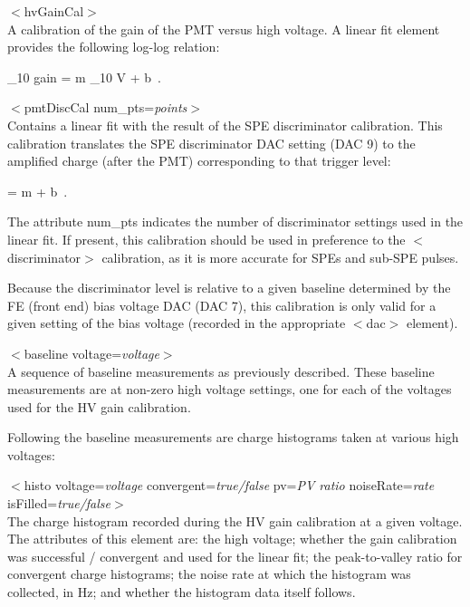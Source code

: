 \documentclass[10pt]{article}
\begin{document}
\item{$<$hvGainCal$>$}\\ 
A calibration of the gain of the PMT versus high voltage.  A linear fit
element provides the following log-log relation:

\be
\log_{10} gain = m \cdot \log_{10} V + b\ .
\ee


\item{$<$pmtDiscCal num\_pts=\textit{points}$>$}\\
Contains a linear fit with the result of the SPE discriminator calibration.
This calibration translates the SPE discriminator DAC setting (DAC 9) to
the amplified charge (after the PMT) corresponding to that trigger level:

\be
{} = m \cdot {} + b\ .
\ee

The attribute num\_pts indicates the number of discriminator settings used in
the linear fit.  If present,
this calibration should be used in preference to the $<$discriminator$>$
calibration, as it is more accurate for SPEs and sub-SPE pulses.  

Because the discriminator level is relative to a given baseline
determined by the FE (front end) bias voltage DAC (DAC 7), this calibration
is only valid for a given setting of the bias voltage (recorded in the
appropriate $<$dac$>$ element). 


\item{$<$baseline voltage=\textit{voltage}$>$}\\
A sequence of baseline measurements as previously described.  These
baseline measurements are at non-zero high voltage settings, one for each
of the voltages used for the HV gain calibration.

Following the baseline measurements are charge histograms taken at various
high voltages:

\item{$<$histo voltage=\textit{voltage} convergent=\textit{true/false}
  pv=\textit{PV ratio} noiseRate=\textit{rate}
  isFilled=\textit{true/false}$>$}\\ 

The charge histogram recorded during the HV gain calibration at a given
voltage.  The attributes of this element are: the high voltage; whether the
gain calibration was successful / convergent and used for the linear fit;
the peak-to-valley ratio for convergent charge histograms; the noise rate
at which the histogram was collected, in Hz; and whether the histogram data
itself follows.
\end{document}

